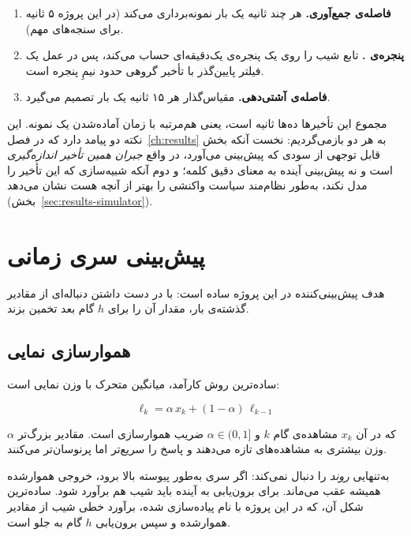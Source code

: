 \begin{enumerate}
  \item \textbf{فاصله‌ی جمع‌آوری.}  هر چند ثانیه یک بار نمونه‌برداری می‌کند
  (در این پروژه ۵ ثانیه برای سنجه‌های مهم).
  \item \textbf{پنجره‌ی .} تابع  شیب را روی یک پنجره‌ی یک‌دقیقه‌ای
  حساب می‌کند، پس در عمل یک فیلتر پایین‌گذر با تأخیر گروهی حدود نیمِ پنجره است.
  \item \textbf{فاصله‌ی آشتی‌دهی.} مقیاس‌گذار هر ۱۵ ثانیه یک بار تصمیم می‌گیرد.
\end{enumerate}

مجموع این تأخیرها ده‌ها ثانیه است، یعنی هم‌مرتبه با زمان آماده‌شدن یک نمونه. این نکته دو
پیامد دارد که در فصل~\ref{ch:results} به هر دو بازمی‌گردیم: نخست آنکه بخش قابل توجهی از سودی
که پیش‌بینی می‌آورد، در واقع \emph{جبران همین تأخیر اندازه‌گیری} است و نه پیش‌بینی آینده به
معنای دقیق کلمه؛ و دوم آنکه شبیه‌سازی که این تأخیر را مدل نکند، به‌طور نظام‌مند سیاست واکنشی
را بهتر از آنچه هست نشان می‌دهد (بخش~\ref{sec:results-simulator}).

\section{پیش‌بینی سری زمانی}
\label{sec:bg-forecasting}

هدف پیش‌بینی‌کننده در این پروژه ساده است: با در دست داشتن دنباله‌ای از مقادیر گذشته‌ی بار،
مقدار آن را برای $h$ گام بعد تخمین بزند.

\subsection{هموارسازی نمایی}
\label{sec:bg-ewma}

ساده‌ترین روش کارآمد، میانگین متحرک با وزن نمایی است:

\begin{equation}
\label{eq:ewma}
\ell_k = \alpha\, x_k + (1-\alpha)\, \ell_{k-1}
\end{equation}

که در آن $x_k$ مشاهده‌ی گام $k$ و $\alpha \in (0,1]$ ضریب هموارسازی است. مقادیر بزرگ‌تر
$\alpha$ وزن بیشتری به مشاهده‌های تازه می‌دهند و پاسخ را سریع‌تر اما پرنوسان‌تر می‌کنند.

 به‌تنهایی \emph{روند} را دنبال نمی‌کند: اگر سری به‌طور پیوسته بالا برود، خروجی
هموارشده همیشه عقب می‌ماند. برای برون‌یابی به آینده باید شیب هم برآورد شود. ساده‌ترین شکل آن،
که در این پروژه با نام  پیاده‌سازی شده، برآورد خطی شیب از مقادیر هموارشده و
سپس برون‌یابی $h$ گام به جلو است.


